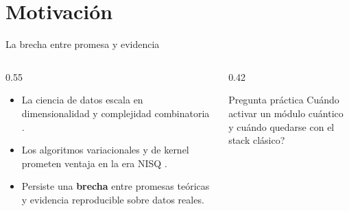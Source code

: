 \documentclass[aspectratio=169,10pt,professionalfonts]{beamer}
\begin{document}
\section{Motivación}
\begin{frame}{La brecha entre promesa y evidencia}
\begin{columns}[T]
\begin{column}{0.55\textwidth}
\begin{itemize}
  \item La ciencia de datos escala en dimensionalidad y complejidad combinatoria \citep{jordan2015, biamonte2017}.
  \item Los algoritmos variacionales y de kernel prometen ventaja en la era NISQ \citep{preskill2018, farhi2014, schuld2021}.
  \item Persiste una \textbf{brecha} entre promesas teóricas y evidencia reproducible sobre datos reales.
\end{itemize}
\end{column}
\begin{column}{0.42\textwidth}
\begin{block}{Pregunta práctica}
\textquestiondown{}Cuándo activar un módulo cuántico\\
y cuándo quedarse con el stack clásico?
\end{block}
\end{column}
\end{columns}
\end{frame}
\end{document}
